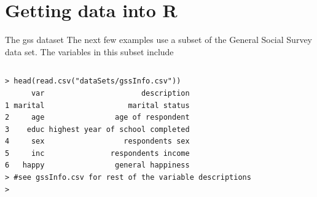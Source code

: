 \documentclass[table,smaller]{beamer}
\begin{document}
\section{Getting data into R}
\label{sec-5}


\begin{frame}[fragile,label=sec-5-1]{The gss dataset}
 The next few examples use a subset of the General Social Survey data set. The variables in this subset include
\vspace{-.5em}
\begin{columns}
\begin{block}{}
\begin{verbatim}
> head(read.csv("dataSets/gssInfo.csv")) 
      var                      description
1 marital                   marital status
2     age                age of respondent
3    educ highest year of school completed
4     sex                  respondents sex
5     inc               respondents income
6   happy                general happiness
> #see gssInfo.csv for rest of the variable descriptions
>
\end{verbatim}
\end{block}
\end{columns}
\vspace{.5em}
\end{frame}
\end{document}
